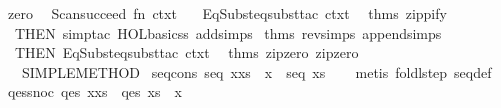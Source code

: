 \begin{isabellebody}
\endisatagproof
{\isafoldproof}%
%
\isadelimproof
\isanewline
%
\endisadelimproof
%
\isadelimML
\isanewline
%
\endisadelimML
%
\isatagML
{}\isamarkupfalse%
\ zero\ {}\ {}\isanewline
Scan{}succeed\ {}fn\ ctxt\ {}{}\isanewline
\ \ EqSubst{}eqsubst{}tac\ ctxt\ {}{}{}\ %
\isaantiq
thms\ zippify{}%
\endisaantiq
\ {}\isanewline
\ \ THEN\ simp{}tac\ {}HOL{}basic{}ss\ addsimps\ %
\isaantiq
thms\ rev{}simps\ append{}simps{}%
\endisaantiq
{}\ {}\isanewline
\ \ THEN\ EqSubst{}eqsubst{}tac\ ctxt\ {}{}{}\ %
\isaantiq
thms\ zip{}zero{}\ zip{}zero{}{}%
\endisaantiq
\ {}\isanewline
\ \ {}{}\ SIMPLE{}METHOD{}\isanewline
{}%
\endisatagML
{\isafoldML}%
%
\isadelimML
\isanewline
%
\endisadelimML
\isanewline
{}\isamarkupfalse%
\ seq{}cons{}\ {}seq\ {}x{}xs{}\ {}\ x\ {}\ seq\ xs{}\isanewline
%
\isadelimproof
\ \ %
\endisadelimproof
%
\isatagproof
{}\isamarkupfalse%
\ {}metis\ foldl{}step\ seq{}def{}%
\endisatagproof
{\isafoldproof}%
%
\isadelimproof
\isanewline
%
\endisadelimproof
\isanewline
{}\isamarkupfalse%
\ qes{}snoc{}\ {}qes\ {}x{}xs{}\ {}\ qes\ xs\ {}\ x{}\isanewline

\end{isabellebody}
